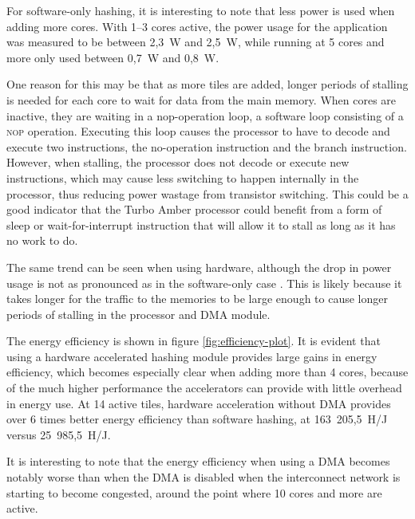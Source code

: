 For software-only hashing, it is interesting to note that less power is used when adding more cores. With 1--3 cores
active, the power usage for the application was measured to be between 2,3~W and 2,5~W, while running at 5 cores and
more only used between 0,7~W and 0,8~W.

One reason for this may be that as more tiles are added, longer periods of stalling is needed for each core to wait for data from
the main memory. When cores are inactive, they are waiting in a nop-operation loop, a software loop consisting of a
\textsc{nop} operation. Executing this loop causes the processor to have to decode and execute two instructions,
the no-operation instruction and the branch instruction. However, when stalling, the processor does not decode or
execute new instructions, which may cause less switching to happen internally in the processor, thus reducing power
wastage from transistor switching. This could be a good indicator that the Turbo Amber processor could benefit
from a form of sleep or wait-for-interrupt instruction that will allow it to stall as long as it has no work to do.

The same trend can be seen when using hardware, although the drop in power usage is not as pronounced as in the software-only
case . This is likely because it takes longer for the traffic to the memories to be large enough to cause longer periods of
stalling in the processor and DMA module.

The energy efficiency is shown in figure \ref{fig:efficiency-plot}. It is evident that using a hardware accelerated
hashing module provides large gains in energy efficiency, which becomes especially clear when adding more than 4 cores,
because of the much higher performance the accelerators can provide with little overhead in energy use. At 14 active
tiles, hardware acceleration without DMA provides over 6 times better energy efficiency than software hashing,
at 163~205,5~H/J versus 25~985,5~H/J.

It is interesting to note that the energy efficiency when using a DMA becomes notably worse than when the DMA is disabled
when the interconnect network is starting to become congested, around the point where 10 cores and more are active.

